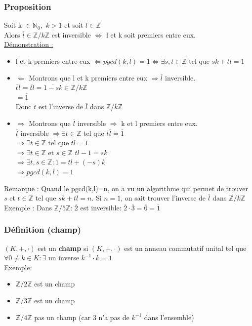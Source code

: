 \documentclass[11pt]{article}
\begin{document}
			\subsubsection{Proposition}
				Soit k $\in \mathbb{N}_0,$ $k > 1$ et soit $l \in \mathbb{Z}$\\
				Alors $\overline{l} \in \mathbb{Z}/k\mathbb{Z}$ est inversible $\Leftrightarrow$ l et k soit premiers entre eux.\\
				\underline{Démonstration :}
				\begin{itemize}
					 \item l et k premiers entre eux $\Leftrightarrow pgcd(k,l) = 1 \Leftrightarrow \exists s, t \in \mathbb{Z}$ tel que $sk+tl = 1$
			 		\item $\Longleftarrow$ Montrons que l et k premiers entre eux $\Rightarrow \overline{l}$ inversible.\\
					$\overline{t} \overline{l} = \overline{tl} = \overline{1-sk} \in \mathbb{Z}/k\mathbb{Z}$\\
					$= \overline{1}$\\
					Donc $\overline{t}$ est l'inverse de $\overline{l}$ dans $\mathbb{Z}/k\mathbb{Z}$
					\item $\Longrightarrow$ Montrons que $\overline{l}$ inversible $\Rightarrow$ k et l premiers entre eux.\\
			$\overline{l}$ inversible $\Rightarrow \exists t \in \mathbb{Z}$ tel que $\overline{t} \overline{l} = \overline{1}$\\
					$\Rightarrow \exists t \in \mathbb{Z}$ tel que $\overline{tl} = \overline{1}$\\
					$\Rightarrow \exists t \in \mathbb{Z}$ et $s \in \mathbb{Z}$ $tl - 1 = sk$\\
					$\Rightarrow \exists t, s \in \mathbb{Z}: 1 = tl +(-s)k$\\
					$\Rightarrow pgcd(k,l) = 1$
				\end{itemize}
				Remarque : Quand le pgcd(k,l)=n, on a vu un algorithme qui permet de trouver $s$ et $t \in \mathbb{Z}$ tel que $sk+tl=n$.  Si $n=1$, on sait trouver l'inverse de $\overline{l}$ dans $\mathbb{Z}/k\mathbb{Z}$\\
				Exemple : Dans $\mathbb{Z}/5\mathbb{Z}$: $\overline{2}$ est inversible: $\overline{2} \cdot \overline{3} = \overline{6} = \overline{1}$
				
			\subsubsection{Définition (champ)}
				$(K,+, \cdot)$ est un \textbf{champ} si $(K,+, \cdot)$ est un anneau commutatif unital tel que $\forall 0 \neq k \in K: \exists$ un inverse $k^{-1} \cdot k=1$\\
				Exemple:
				\begin{itemize}
			 		\item $\mathbb{Z}/2\mathbb{Z}$ est un champ
			 		\item $\mathbb{Z}/3\mathbb{Z}$ est un champ
			 		\item $\mathbb{Z}/4\mathbb{Z}$ pas un champ (car $\overline{3}$ n'a pas de $k^{-1}$ dans l'ensemble)
				\end{itemize}
			
\end{document}
